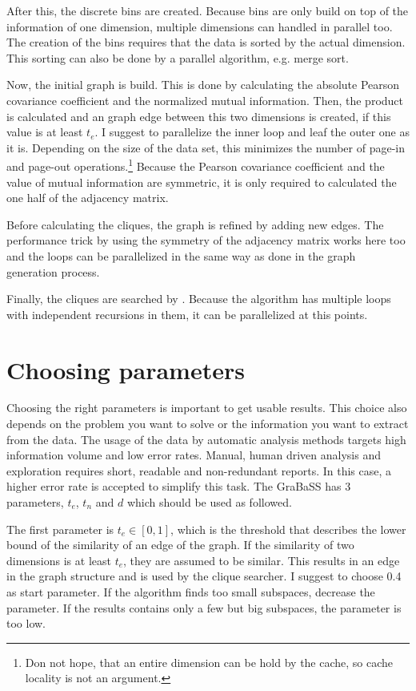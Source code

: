 After this, the discrete bins are created. Because bins are only build on top of the information of one dimension, multiple dimensions can handled in parallel too. The creation of the bins requires that the data is sorted by the actual dimension. This sorting can also be done by a parallel algorithm, e.g. merge sort.

Now, the initial graph is build. This is done by calculating the absolute Pearson covariance coefficient and the normalized mutual information. Then, the product is calculated and an graph edge between this two dimensions is created, if this value is at least $t_e$. I suggest to parallelize the inner loop and leaf the outer one as it is. Depending on the size of the data set, this minimizes the number of page-in and page-out operations.\footnote{Don not hope, that an entire dimension can be hold by the cache, so cache locality is not an argument.} Because the Pearson covariance coefficient and the value of mutual information are symmetric, it is only required to calculated the one half of the adjacency matrix.

Before calculating the cliques, the graph is refined by adding new edges. The performance trick by using the symmetry of the adjacency matrix works here too and the loops can be parallelized in the same way as done in the graph generation process.

Finally, the cliques are searched by \cite{listingCliques}. Because the algorithm has multiple loops with independent recursions in them, it can be parallelized at this points.

\section{Choosing parameters}
Choosing the right parameters is important to get usable results. This choice also depends on the problem you want to solve or the information you want to extract from the data. The usage of the data by automatic analysis methods targets high information volume and low error rates. Manual, human driven analysis and exploration requires short, readable and non-redundant reports. In this case, a higher error rate is accepted to simplify this task. The GraBaSS has \num{3} parameters, $t_e$, $t_n$ and $d$ which should be used as followed.

The first parameter is $t_e \in [0,1]$, which is the threshold that describes the lower bound of the similarity of an edge of the graph. If the similarity of two dimensions is at least $t_e$, they are assumed to be similar. This results in an edge in the graph structure and is used by the clique searcher. I suggest to choose \num{0.4} as start parameter. If the algorithm finds too small subspaces, decrease the parameter. If the results contains only a few but big subspaces, the parameter is too low.

